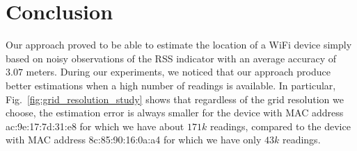 \documentclass{article}
\begin{document}
\section{Conclusion}
\vspace{-.3cm}
Our approach proved to be able to estimate the location of a WiFi device simply based on
noisy observations of the RSS indicator with an average accuracy of $3.07$ meters.
During our experiments, we noticed that our approach produce better estimations when 
a high number of readings is available. In particular, Fig.~\ref{fig:grid_resolution_study} shows
that regardless of the grid resolution we choose, 
the estimation error is always smaller for the device with MAC address ac:9e:17:7d:31:e8
for which we have about $171k$ readings, compared to the device with MAC address
8c:85:90:16:0a:a4 for which we have only $43k$ readings.


{\scriptsize%

}
\end{document}
